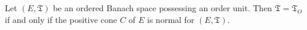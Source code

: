 Let $(E, \mathfrak{T})$ be an ordered Banach space possessing an order unit. Then $\mathfrak{T} = \mathfrak{T}_O$ if and only if the positive cone $C$ of $E$ is normal for $(E, \mathfrak{T})$.

